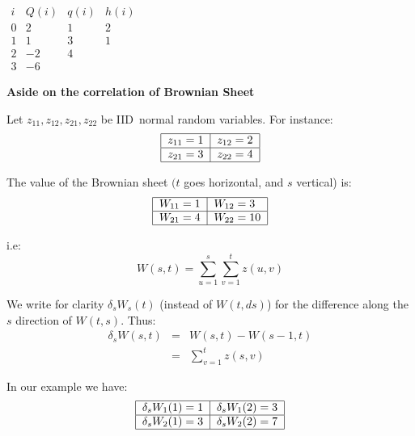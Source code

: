 \documentclass{article}
\begin{document}
$%
\begin{array}{ccccc}
i & Q(i) & q(i) & h(i) &  \\ 
0 & 2 & 1 & 2 &  \\ 
1 & 1 & 3 & 1 &  \\ 
2 & -2 & 4 &  &  \\ 
3 & -6 &  &  & 
\end{array}%
$

\textbf{Aside on the correlation of Brownian Sheet}

Let $z_{11},z_{12},z_{21},z_{22}$ be IID\ normal random variables. For
instance:%
\begin{equation*}
\begin{tabular}{|l|l|}
\hline
$z_{11}=1$ & $z_{12}=2$ \\ \hline
$z_{21}=3$ & $z_{22}=4$ \\ \hline
\end{tabular}%
\end{equation*}

The value of the Brownian sheet $(t$ goes horizontal, and $s$ vertical) is:%
\begin{equation*}
\begin{tabular}{|l|l|}
\hline
$W_{11}=1$ & $W_{12}=3$ \\ \hline
$W_{21}=4$ & $W_{22}=10$ \\ \hline
\end{tabular}%
\end{equation*}

i.e:%
\begin{equation*}
W(s,t)=\sum_{u=1}^{s}\sum_{v=1}^{t}z(u,v)
\end{equation*}

We write for clarity $\delta _{s}W_{s}(t)$ (instead of $W(t,ds)$) for the
difference along the $s$ direction of $W(t,s)$. Thus:%
\begin{eqnarray*}
\delta _{s}W(s,t) &=&W(s,t)-W(s-1,t) \\
&=&\sum_{v=1}^{t}z(s,v)
\end{eqnarray*}

In our example we have:%
\begin{equation*}
\begin{tabular}{|l|l|}
\hline
$\delta _{s}W_{1}(1)=1$ & $\delta _{s}W_{1}(2)=3$ \\ \hline
$\delta _{s}W_{2}(1)=3$ & $\delta _{s}W_{2}(2)=7$ \\ \hline
\end{tabular}%
\end{equation*}
\end{document}
